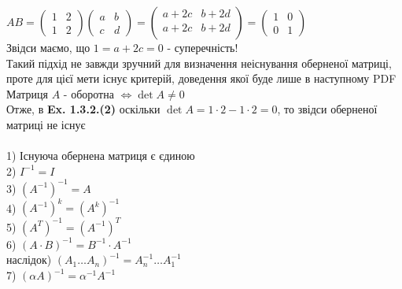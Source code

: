 \documentclass[a4paper, 10pt]{article}
\theoremstyle{theoremdd}
\begin{document}
	$AB = \begin{pmatrix}
	1 & 2 \\
	1 & 2
	\end{pmatrix} \begin{pmatrix}
	a & b \\
	c & d
	\end{pmatrix} = \begin{pmatrix}
	a + 2c & b + 2d \\
	a + 2c & b + 2d \\
	\end{pmatrix} = \begin{pmatrix}
	1 & 0 \\
	0 & 1
	\end{pmatrix}$\\
	Звідси маємо, що $1 = a + 2c = 0$ - суперечність!\\
	Такий підхід не завжди зручний для визначення неіснування оберненої матриці, проте для цієї мети існує критерій, доведення якої буде лише в наступному PDF
	\bigskip \\
	 Матриця $A$ - оборотна $\iff \det A \neq 0$
	\bigskip \\
	Отже, в \textbf{Ex. 1.3.2.(2)} оскільки $\det A = 1 \cdot 2 - 1 \cdot 2 = 0$, то звідси оберненої матриці не існує
	\bigskip \\
	\\
	1) Існуюча обернена матриця є єдиною\\
	2) $I^{-1} = I$\\
	3) $(A^{-1})^{-1} = A$\\
	4) $(A^{-1})^k = (A^k)^{-1}$\\
	5) $(A^T)^{-1} = (A^{-1})^T$\\
	6) $(A \cdot B)^{-1} = B^{-1} \cdot A^{-1}$\\
	наслідок) $(A_1 \dots A_n)^{-1} = A_n^{-1} \dots A_1^{-1}$\\
	7) $(\alpha A)^{-1} = \alpha^{-1} A^{-1}$\\
\end{document}
